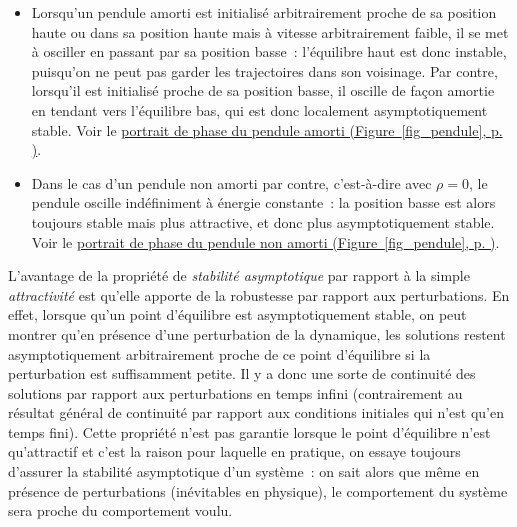 \hypertarget{ex_stab}{}
\begin{exemple}\label{ex_stab}
\begin{itemize}
\item
  Lorsqu'un pendule amorti est initialisé arbitrairement proche de sa
  position haute ou dans sa position haute mais à vitesse arbitrairement
  faible, il se met à osciller en passant par sa position basse~:
  l'équilibre haut est donc instable, puisqu'on ne peut pas garder les
  trajectoires dans son voisinage. Par contre, lorsqu'il est initialisé
  proche de sa position basse, il oscille de façon amortie en tendant
  vers l'équilibre bas, qui est donc localement asymptotiquement stable.
  Voir le \protect\hyperlink{fig_pendule}{portrait de phase du pendule
  amorti (Figure~\ref*{fig_pendule}, p. \pageref*{fig_pendule})}.
\item
  Dans le cas d'un pendule non amorti par contre, c'est-à-dire avec
  \(\rho=0\), le pendule oscille indéfiniment à énergie constante~: la
  position basse est alors toujours stable mais plus attractive, et donc
  plus asymptotiquement stable. Voir le
  \protect\hyperlink{fig_pendule}{portrait de phase du pendule non
  amorti (Figure~\ref*{fig_pendule}, p. \pageref*{fig_pendule})}.
\end{itemize}
\end{exemple}

\hypertarget{rem_robustStab}{}
\begin{remarque}\label{rem_robustStab}
L'avantage de la propriété de \emph{stabilité asymptotique} par rapport
à la simple \emph{attractivité} est qu'elle apporte de la robustesse par
rapport aux perturbations. En effet, lorsque qu'un point d'équilibre est
asymptotiquement stable, on peut montrer qu'en présence d'une
perturbation de la dynamique, les solutions restent asymptotiquement
arbitrairement proche de ce point d'équilibre si la perturbation est
suffisamment petite. Il y a donc une sorte de continuité des solutions
par rapport aux perturbations en temps infini (contrairement au résultat
général de continuité par rapport aux conditions initiales qui n'est
qu'en temps fini). Cette propriété n'est pas garantie lorsque le point
d'équilibre n'est qu'attractif et c'est la raison pour laquelle en
pratique, on essaye toujours d'assurer la stabilité asymptotique d'un
système~: on sait alors que même en présence de perturbations
(inévitables en physique), le comportement du système sera proche du
comportement voulu.
\end{remarque}

